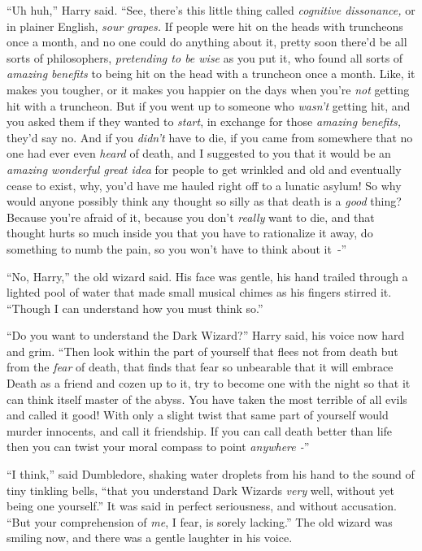 ``Uh huh,'' Harry said. ``See, there's this little thing called \emph{cognitive dissonance,} or in plainer English, \emph{sour grapes.} If people were hit on the heads with truncheons once a month, and no one could do anything about it, pretty soon there'd be all sorts of philosophers, \emph{pretending to be wise} as you put it, who found all sorts of \emph{amazing benefits} to being hit on the head with a truncheon once a month. Like, it makes you tougher, or it makes you happier on the days when you're \emph{not} getting hit with a truncheon. But if you went up to someone who \emph{wasn't} getting hit, and you asked them if they wanted to \emph{start}, in exchange for those \emph{amazing benefits,} they'd say no. And if you \emph{didn't} have to die, if you came from somewhere that no one had ever even \emph{heard} of death, and I suggested to you that it would be an \emph{amazing wonderful great idea} for people to get wrinkled and old and eventually cease to exist, why, you'd have me hauled right off to a lunatic asylum! So why would anyone possibly think any thought so silly as that death is a \emph{good} thing? Because you're afraid of it, because you don't \emph{really} want to die, and that thought hurts so much inside you that you have to rationalize it away, do something to numb the pain, so you won't have to think about it~-''

``No, Harry,'' the old wizard said. His face was gentle, his hand trailed through a lighted pool of water that made small musical chimes as his fingers stirred it. ``Though I can understand how you must think so.''

``Do you want to understand the Dark Wizard?'' Harry said, his voice now hard and grim. ``Then look within the part of yourself that flees not from death but from the \emph{fear} of death, that finds that fear so unbearable that it will embrace Death as a friend and cozen up to it, try to become one with the night so that it can think itself master of the abyss. You have taken the most terrible of all evils and called it good! With only a slight twist that same part of yourself would murder innocents, and call it friendship. If you can call death better than life then you can twist your moral compass to point \emph{anywhere -}''

``I think,'' said Dumbledore, shaking water droplets from his hand to the sound of tiny tinkling bells, ``that you understand Dark Wizards \emph{very} well, without yet being one yourself.'' It was said in perfect seriousness, and without accusation. ``But your comprehension of \emph{me}, I fear, is sorely lacking.'' The old wizard was smiling now, and there was a gentle laughter in his voice.

